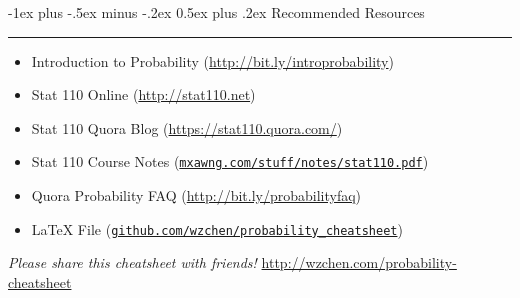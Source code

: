 \documentclass[10pt,landscape]{article}
\makeatletter
\renewcommand{\section}{\@startsection{section}{1}{0mm}%
                                {-1ex plus -.5ex minus -.2ex}%
                                {0.5ex plus .2ex}%
                                {\normalfont\large\bfseries}}
\makeatother
\begin{document}
\begin{multicols}{3}
\section{Recommended Resources} \smallskip \hrule height 2pt \smallskip

\begin{itemize} \itemsep -.25em
\item Introduction to Probability (\url{http://bit.ly/introprobability})
\item Stat 110 Online (\url{http://stat110.net})
\item Stat 110 Quora Blog (\url{https://stat110.quora.com/})
\item Stat 110 Course Notes (\texttt{\href{http://www.mxawng.com/stuff/notes/stat110.pdf}{mxawng.com/stuff/notes/stat110.pdf}})
\item Quora Probability FAQ (\url{http://bit.ly/probabilityfaq})
\item LaTeX File (\texttt{\href{https://github.com/wzchen/probability_cheatsheet}{github.com/wzchen/probability\_cheatsheet}})
\end{itemize}

\begin{center}\emph{Please share this cheatsheet with friends!} \url{http://wzchen.com/probability-cheatsheet}\end{center}

\end{multicols}
\end{document}
